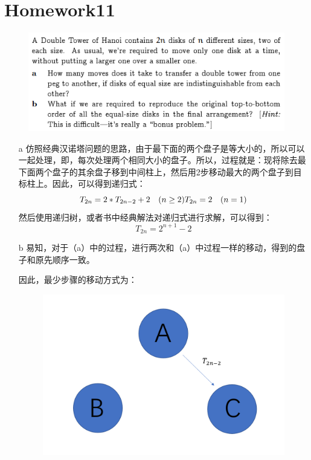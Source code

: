 \documentclass[]{article}
\begin{document}
\section*{Homework11}
\begin{figure}[H]
	\includegraphics[scale=1]{H11}
\end{figure}
\begin{enumerate}
	\item[a] 仿照经典汉诺塔问题的思路，由于最下面的两个盘子是等大小的，所以可以一起处理，即，每次处理两个相同大小的盘子。所以，过程就是：现将除去最下面两个盘子的其余盘子移到中间柱上，然后用2步移动最大的两个盘子到目标柱上。因此，可以得到递归式：
	\begin{equation}
		T_{2n} = 2*T_{2n-2} + 2 \quad (n \ge 2) \\
		T_{2n} = 2 \quad (n = 1)
	\end{equation}
	然后使用递归树，或者书中经典解法对递归式进行求解，可以得到：
	\begin{equation}
		T_{2n} = 2^{n+1} - 2
	\end{equation}
	\item[b] 易知，对于（a）中的过程，进行两次和（a）中过程一样的移动，得到的盘子和原先顺序一致。\par 
	因此，最少步骤的移动方式为：
\begin{figure}[H]
	\includegraphics[scale=0.4]{P1}

\end{figure}
\end{enumerate}
\end{document}
